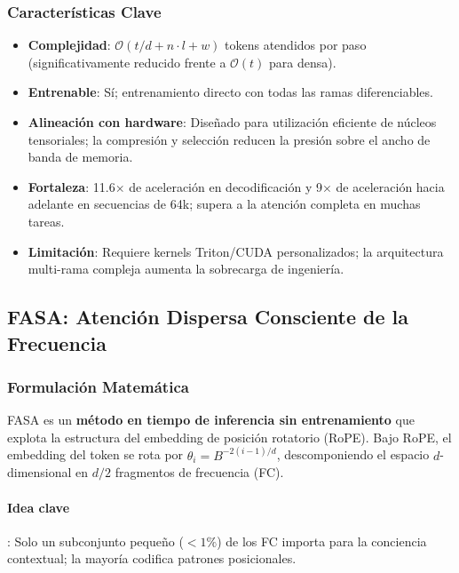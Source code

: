 \subsubsection{Características Clave}

\begin{itemize}[leftmargin=*]
    \item \textbf{Complejidad}: $\mathcal{O}(t/d + n \cdot l + w)$ tokens atendidos por paso (significativamente reducido frente a $\mathcal{O}(t)$ para densa).
    \item \textbf{Entrenable}: Sí; entrenamiento directo con todas las ramas diferenciables.
    \item \textbf{Alineación con hardware}: Diseñado para utilización eficiente de núcleos tensoriales; la compresión y selección reducen la presión sobre el ancho de banda de memoria.
    \item \textbf{Fortaleza}: 11.6$\times$ de aceleración en decodificación y 9$\times$ de aceleración hacia adelante en secuencias de 64k; supera a la atención completa en muchas tareas.
    \item \textbf{Limitación}: Requiere kernels Triton/CUDA personalizados; la arquitectura multi-rama compleja aumenta la sobrecarga de ingeniería.
\end{itemize}

\subsection{FASA: Atención Dispersa Consciente de la Frecuencia}

\subsubsection{Formulación Matemática}

FASA \citep{wang_fasa_2026} es un \textbf{método en tiempo de inferencia sin entrenamiento} que explota la estructura del embedding de posición rotatorio (RoPE). Bajo RoPE, el embedding del token se rota por $\theta_i = B^{-2(i-1)/d}$, descomponiendo el espacio $d$-dimensional en $d/2$ fragmentos de frecuencia (FC).

\paragraph{Idea clave}: Solo un subconjunto pequeño ($ < 1\%$) de los FC importa para la conciencia contextual; la mayoría codifica patrones posicionales.


